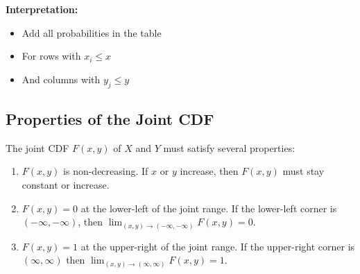 \documentclass[12pt]{article}
\begin{document}
\textbf{Interpretation:}
\begin{itemize}
    \item Add all probabilities in the table 
    \item For rows with $x_i \le x$ 
    \item And columns with $y_j \le y$ 
\end{itemize}

\subsection{Properties of the Joint CDF}
The joint CDF $F(x,y)$ of $X$ and $Y$ must satisfy several properties: 
\begin{enumerate}
    \item $F(x,y)$ is non-decreasing. If $x$ or $y$ increase, then $F(x,y)$ must stay constant or increase. 
    \item $F(x,y) = 0$ at the lower-left of the joint range. If the lower-left corner is $(-\infty, -\infty)$, then 
    $\lim_{(x,y) \rightarrow (-\infty, -\infty)} F(x,y) = 0$. 
    \item $F(x,y) = 1$ at the upper-right of the joint range. If the upper-right corner is $(\infty, \infty)$ then 
    $\lim_{(x,y) \rightarrow (\infty, \infty)} F(x,y) = 1$. 
\end{enumerate}
\end{document}

